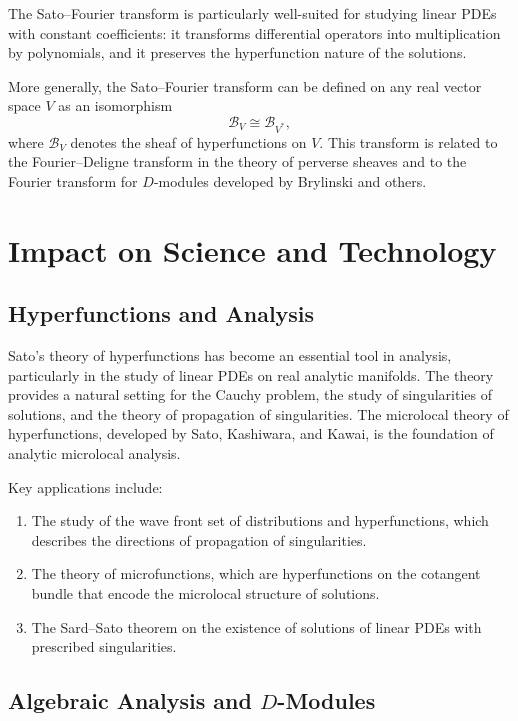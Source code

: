 The Sato--Fourier transform is particularly well-suited for studying linear PDEs with constant coefficients: it transforms differential operators into multiplication by polynomials, and it preserves the hyperfunction nature of the solutions.

More generally, the Sato--Fourier transform can be defined on any real vector space \(V\) as an isomorphism
\[
\mathcal{B}_V \cong \mathcal{B}_{V^*},
\]
where \(\mathcal{B}_V\) denotes the sheaf of hyperfunctions on \(V\). This transform is related to the Fourier--Deligne transform in the theory of perverse sheaves and to the Fourier transform for \(D\)-modules developed by Brylinski and others.

\section{Impact on Science and Technology}

\subsection{Hyperfunctions and Analysis}

Sato's theory of hyperfunctions has become an essential tool in analysis, particularly in the study of linear PDEs on real analytic manifolds. The theory provides a natural setting for the Cauchy problem, the study of singularities of solutions, and the theory of propagation of singularities. The microlocal theory of hyperfunctions, developed by Sato, Kashiwara, and Kawai, is the foundation of analytic microlocal analysis.

Key applications include:
\begin{enumerate}
    \item The study of the wave front set of distributions and hyperfunctions, which describes the directions of propagation of singularities.
    \item The theory of microfunctions, which are hyperfunctions on the cotangent bundle that encode the microlocal structure of solutions.
    \item The Sard--Sato theorem on the existence of solutions of linear PDEs with prescribed singularities.
\end{enumerate}

\subsection{Algebraic Analysis and \texorpdfstring{\(D\)}{D}-Modules}

